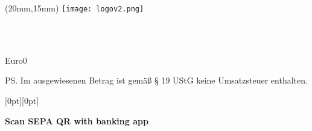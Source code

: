 \documentclass[a4paper]{scrlttr2}
\newcommand{\totalAmount}{}
\newcommand{\CalcFee}[3]{%
    \FPmul{\rawAmount}{#2}{#3} %
    \FPround{\totalAmount}{\rawAmount}{2} %
}
\begin{document}
	\begin{letter}{
	\begin{textblock*}{40mm}(20mm,15mm)   %
		\texttt{[image: logov2.png]}
	\end{textblock*}

	\ifthenelse{\equal{\customerCompany}{}}{}{\customerCompany \\}
	\ifthenelse{\equal{\customerName}{}}{}{\customerName \\} 
	\customerStreet \\ 
	\customerZIP~\customerCity}

		\opening{\invoiceSalutation}
		\invoiceText

		\CalcFee{Software Beratung}{\hourprice}{\hournumber}
		
		    \begin{invoice}{Euro}{0}
			    
		    \end{invoice}
		
		\ps Im ausgewiesenen Betrag ist gemäß § 19 UStG keine Umsatzsteuer 
		enthalten.
		
		\renewcommand*{\raggedsignature}{\raggedright} 
		\closing{\invoiceClosing}
		\invoiceEnclosures

		\vspace*{0.5cm} %
		\noindent %
		\hfill %
		\raisebox{-3cm}[0pt][0pt]{%
		    \QRbill*[
		        Account=\accountIBAN,
		        Name=\senderName,
		        Amount=EUR\totalAmount,
		        Message={Rechnung \invoiceReference}
		    ]
		}

		\vspace*{3.2cm} %
		\noindent %
		\hfill %
		\textbf{Scan SEPA QR with banking app}
		\enlargethispage{30cm} %
	\end{letter}
\end{document}
